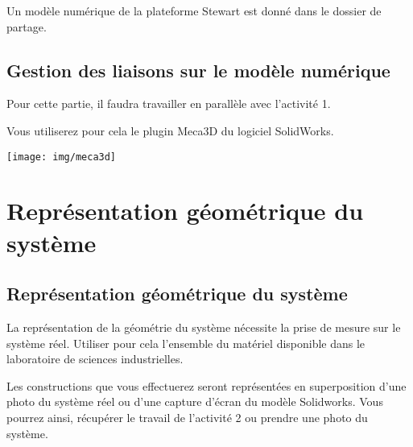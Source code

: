 Un modèle numérique de la plateforme Stewart est donné dans le dossier de partage.



\subsection{Gestion des liaisons sur le modèle numérique}

Pour cette partie, il faudra travailler en parallèle avec l'activité 1.


\begin{minipage}{0.45\linewidth}
Vous utiliserez pour cela le plugin Meca3D du logiciel SolidWorks.
\end{minipage}
\hfill
\begin{minipage}{0.5\linewidth}
\texttt{[image: img/meca3d]}
\end{minipage}

\section{Représentation géométrique du système}

\subsection{Représentation géométrique du système}

La représentation de la géométrie du système nécessite la prise de mesure sur le système réel. Utiliser pour cela l'ensemble du matériel disponible dans le laboratoire de sciences industrielles.

Les constructions que vous effectuerez seront représentées en superposition d'une photo du système réel ou d'une capture d'écran du modèle Solidworks. Vous pourrez ainsi, récupérer le travail de l'activité 2 ou prendre une photo du système.

